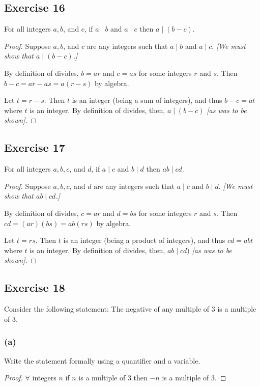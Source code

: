 \documentclass[14pt]{extarticle}
\newcommand{\fa}{\forall}
\begin{document}
\subsection{Exercise 16}
For all integers $a, b$, and $c$, if $a \mid b$ and $a \mid c$ then $a \mid (b - c)$.

\begin{proof}
    Suppose $a, b$, and $c$ are any integers such that $a\mid b$ and $a \mid c$. {\it [We must show that $a \mid (b - c)$.]}

    By definition of divides, $b = ar$ and $c = as$ for some integers $r$ and $s$. Then $b - c = ar - as = a(r - s)$ by algebra.

    Let $t = r - s$. Then $t$ is an integer (being a sum of integers), and thus $b - c = at$ where $t$ is an integer. By definition of divides, then, $a \mid (b - c)$ {\it [as was to be shown]}.
\end{proof}

\subsection{Exercise 17}
For all integers $a, b, c$, and $d$, if $a \mid c$ and $b \mid d$ then $ab \mid cd$.

\begin{proof}
    Suppose $a, b, c$, and $d$ are any integers such that $a \mid c$ and $b \mid d$. {\it [We must show that $ab \mid cd $.]}

    By definition of divides, $c = ar$ and $d = bs$ for some integers $r$ and $s$. Then $cd = (ar)(bs) = ab(rs)$ by algebra.

    Let $t = rs$. Then $t$ is an integer (being a product of integers), and thus $cd = abt$ where $t$ is an integer. By definition of divides, then, $ab \mid cd)$ {\it [as was to be shown]}.
\end{proof}

\subsection{Exercise 18}
Consider the following statement: The negative of any multiple of 3 is a multiple of 3.

\subsubsection{(a)}
Write the statement formally using a quantifier and a variable.

\begin{proof}
    $\fa$ integers $n$ if $n$ is a multiple of 3 then $-n$ is a multiple of 3.
\end{proof}
\end{document}
